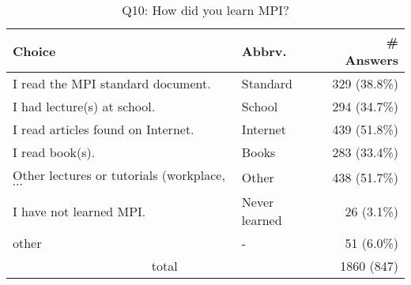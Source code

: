 \begin{table}[htb]%
\begin{center}%
\caption{Q10: How did you learn MPI?}%
\label{tab:Q10-ans}%
\begin{tabular}{l|l|r}%
\hline%
Choice & Abbrv. & \# Answers \\%
\hline%
I read the MPI standard document. & Standard & 329 (38.8\%) \\%
I had lecture(s) at school. & School & 294 (34.7\%) \\%
I read articles found on Internet. & Internet & 439 (51.8\%) \\%
I read book(s). & Books & 283 (33.4\%) \\%
{\small Other lectures or tutorials (workplace, $\cdots$} & Other & 438 (51.7\%) \\%
I have not learned MPI. & Never learned & 26 (3.1\%) \\%
other & - & 51 (6.0\%) \\%
\hline%
\multicolumn{2}{c}{total} & 1860 (847)\\%
\hline%
\end{tabular}%
\end{center}%
\end{table}%
